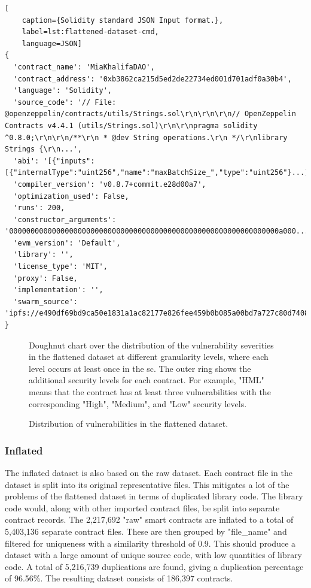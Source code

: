 \begin{lstlisting}[
    caption={Solidity standard JSON Input format.},
    label=lst:flattened-dataset-cmd,
    language=JSON]
{
  'contract_name': 'MiaKhalifaDAO',
  'contract_address': '0xb3862ca215d5ed2de22734ed001d701adf0a30b4',
  'language': 'Solidity',
  'source_code': '// File: @openzeppelin/contracts/utils/Strings.sol\r\n\r\n\r\n// OpenZeppelin Contracts v4.4.1 (utils/Strings.sol)\r\n\r\npragma solidity ^0.8.0;\r\n\r\n/**\r\n * @dev String operations.\r\n */\r\nlibrary Strings {\r\n...',
  'abi': '[{"inputs":[{"internalType":"uint256","name":"maxBatchSize_","type":"uint256"}...]',
  'compiler_version': 'v0.8.7+commit.e28d00a7',
  'optimization_used': False,
  'runs': 200,
  'constructor_arguments': '000000000000000000000000000000000000000000000000000000000000000a000...',
  'evm_version': 'Default',
  'library': '',
  'license_type': 'MIT',
  'proxy': False,
  'implementation': '',
  'swarm_source': 'ipfs://e490df69bd9ca50e1831a1ac82177e826fee459b0b085a00bd7a727c80d74089'
}
\end{lstlisting}

\begin{figure}[htbp]
    \centering
    
    \caption{Doughnut chart over the distribution of the vulnerability severities in the flattened dataset at different granularity levels, where each level occurs at least once in the \acrshort{sc}. The outer ring shows the additional security levels for each contract. For example, "HML" means that the contract has at least three vulnerabilities with the corresponding "High", "Medium", and "Low" security levels.}
\end{figure}


\begin{figure}[htbp]
    \centering
    
    \caption{Distribution of vulnerabilities in the flattened dataset.}
\end{figure}

\subsubsection{Inflated}
\label{sec:verified-smart-contracts-inflated}
The inflated dataset is also based on the raw dataset. Each contract file in the dataset is split into its original representative files. This mitigates a lot of the problems of the flattened dataset in terms of duplicated library code. The library code would, along with other imported contract files, be split into separate contract records. The 2,217,692 "raw" smart contracts are inflated to a total of 5,403,136 separate contract files. These are then grouped by "file\_name" and filtered for uniqueness with a similarity threshold of 0.9. This should produce a dataset with a large amount of unique source code, with low quantities of library code. A total of 5,216,739 duplications are found, giving a duplication percentage of 96.56\%. The resulting dataset consists of 186,397 contracts.

